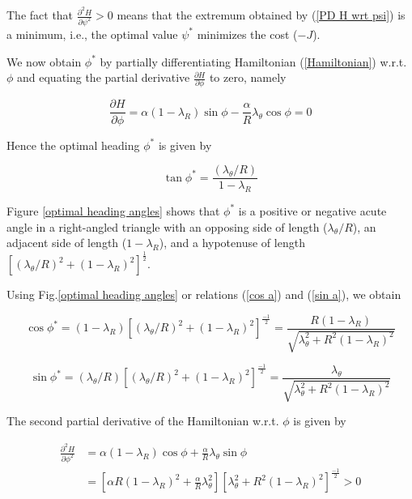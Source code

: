 The fact that $\frac{\partial^2 H}{\partial \psi^2}>0$ means that the extremum obtained by (\ref{PD H wrt psi}) is a minimum, i.e., the optimal value $\psi^*$ minimizes the cost ($-J$).

We now obtain $\phi^*$ by partially differentiating Hamiltonian (\ref{Hamiltonian}) w.r.t. $\phi$ and equating the partial derivative $\frac{\partial H}{\partial \phi}$ to zero, namely 

\begin{equation} 
	\frac{\partial H}{\partial \phi} = \alpha (1-\lambda_R) \sin \phi - \frac{\alpha}{R} \lambda_\theta \cos \phi =0 
\label{PD H wrt phi}
\end{equation} 

Hence the optimal heading $\phi^*$ is given by 

\begin{equation}
	\tan \phi^* = \dfrac{(\lambda_\theta/R)}{1- \lambda_R}
\label{tan phi}
\end{equation}

Figure \ref{optimal heading angles} shows that $\phi^*$ is a positive or negative acute angle in a right-angled triangle with an opposing side of length ($\lambda_\theta/R$), an adjacent side of length ($1- \lambda_R$), and a hypotenuse of length $[(\lambda_\theta/R)^2+(1-\lambda_R)^2]^\frac{1}{2}$.

Using Fig.\ref{optimal heading angles} or relations (\ref{cos a}) and (\ref{sin a}), we obtain


\begin{equation}
	\cos \phi^* = (1-\lambda_R)[(\lambda_\theta/R)^2+(1-\lambda_R)^2]^\frac{-1}{2} 
	= \dfrac{R (1- \lambda_R)}{\sqrt{\lambda^2 _\theta + R^2 (1-\lambda_R)^2}}
\label{cos phi}
\end{equation}


\begin{equation}
\sin \phi^* = (\lambda_\theta /R)[(\lambda_\theta/R)^2+(1-\lambda_R)^2]^\frac{-1}{2} 
= \dfrac{\lambda_\theta}{\sqrt{\lambda^2 _\theta + R^2 (1-\lambda_R)^2}}
\label{sin phi}
\end{equation}

The second partial derivative of the Hamiltonian w.r.t. $\phi$ is given by 

\begin{equation}
\begin{split}
\frac{\partial^2 H}{\partial \phi^2}& = \alpha(1- \lambda_R)  \cos \phi +  \frac{\alpha }{R}\lambda_\theta \sin \phi \\
&= [\alpha R (1-\lambda_R)^2 +\frac{\alpha}{R} \lambda^2 _ \theta  ][\lambda^2_\theta + R^2 (1-\lambda_R)^2]^\frac{-1}{2} > 0
\end{split}
\end{equation}

